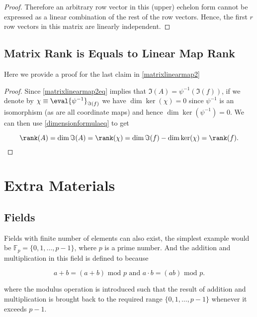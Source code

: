 \documentclass[a4paper,12pt]{report}
\begin{document}
\begin{appendices}
\begin{proof}
    Therefore an arbitrary row vector in this (upper) echelon form cannot be expressed as a linear combination of the rest of the row vectors. Hence, the first \(r\) row vectors in this matrix are linearly independent.         
    
\end{proof}

\section{Matrix Rank is Equals to Linear Map Rank}

Here we provide a proof for the last claim in \cref{matrixlinearmap2} 

\begin{proof}
Since \cref{matrixlinearmap2eq} implies that \(\Im (A) = \psi ^{-1} (\Im (f))\), if we denote by \(\chi \equiv \eval{\psi  ^{-1}}_{\Im (f)}^{}  \) we have \(\dim \ker (\chi ) = 0\) since \(\psi ^{-1} \) is an isomorphism (as are all coordinate maps) and hence \(\dim \ker (\psi ^{-1} ) = 0\). We can then use \cref{dimensionformulaeq} to get

\begin{equation}
    \rank (A) = \dim \Im (A) = \rank (\chi ) = \dim \Im (f) - \dim \ker (\chi ) = \rank (f).
\end{equation}
\end{proof}






\chapter{Extra Materials}

\section{Fields} \label{fields} 

Fields with finite number of elements can also exist, the simplest example would be \(\mathbb{F}_{p} = \{0,1,\ldots ,p-1\} \), where \(p\) is a prime number. And the addition and multiplication in this field is defined to because

\begin{equation}
    a + b = (a+b) \text{ mod } p \text { and } a \cdot b = (ab) \text{ mod } p. 
\end{equation}

where the modulus operation is introduced such that the result of addition and multiplication is brought back to the required range \(\{0,1,\ldots ,p-1\}\) whenever it exceeds \(p-1\).


\end{appendices}
\end{document}

